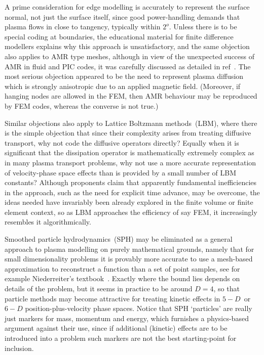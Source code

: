 A prime consideration for edge modelling is accurately to represent the surface
normal, not just the surface itself, since good power-handling demands that
plasma flows in close to tangency, typically within $2^{o}$. Unless there is to be
special coding at boundaries, the educational material for finite difference
modellers explains why this approach is unsatisfactory, and the same objection
also applies to AMR type meshes, although in view of the unexpected success of AMR
in fluid and PIC codes, it was carefully discussed as detailed in ref~\cite{y1re211}. The
most serious objection appeared to be the need to represent plasma diffusion
which is strongly anisotropic due to an applied magnetic field. (Moreover,
if hanging nodes are allowed in the FEM, then AMR behaviour may be reproduced by FEM codes,
whereas the converse is not true.)

Similar objections also apply to Lattice Boltzmann methods~(LBM), where there is the simple
objection that since their complexity arises from treating diffusive transport, why not code
the diffusive operators directly? Equally when it is significant that
the dissipation operator is mathematically extremely complex as
in many plasma transport problems, why not use a more accurate representation of
velocity-phase space effects than is provided by a small number of LBM constants?
Although proponents claim that apparently fundamental inefficiencies in the approach,
such as the need for explicit time advance, may be overcome, the ideas needed have
invariably been already explored in the finite volume or finite element context,
so as LBM approaches the efficiency of say FEM, it increasingly resembles it algorithmically.

Smoothed particle hydrodynamics~(SPH) may be eliminated as a general approach to
plasma modelling on purely mathematical grounds, namely that for small dimensionality
problems it is provably more accurate to use a mesh-based approximation to reconstruct a function
than a set of point samples, see for example Niederreiter's textbook~\cite{niederreiter}.
Exactly where the bound lies depends on details of the problem, but it seems in
practice to be around $D=4$, so that particle methods may become attractive for
treating kinetic effects in $5-D$~or~$6-D$ position-plus-velocity phase spaces.
Notice that SPH `particles' are really just markers for mass, momentum and energy,
which furnishes a physics-based argument against their use, since 
if additional (kinetic) effects are to be introduced into a problem such
markers are not the best starting-point for inclusion.

